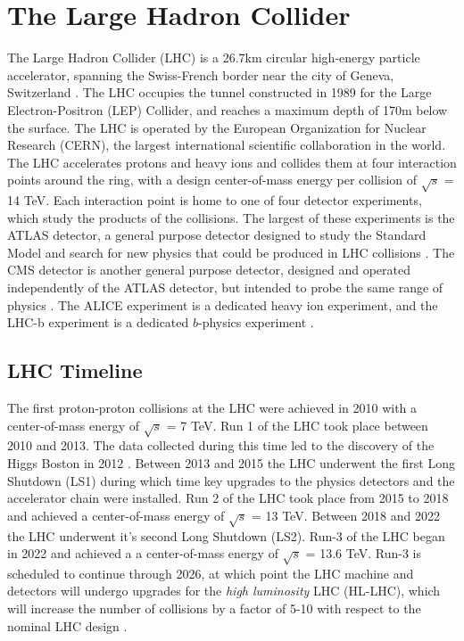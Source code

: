 \chapter{The Large Hadron Collider}
The Large Hadron Collider (LHC) is a 26.7km circular high-energy particle accelerator, spanning the Swiss-French border near the city of Geneva, Switzerland \cite{LHC_machine}. The LHC occupies the tunnel constructed in 1989 for the Large Electron-Positron (LEP) Collider, and reaches a maximum depth of 170m below the surface. The LHC is operated by the European Organization for Nuclear Research (CERN), the largest international scientific collaboration in the world.\\

The LHC accelerates protons and heavy ions and collides them at four interaction points around the ring, with a design center-of-mass energy per collision of $\sqrt{s}$ = 14 TeV. Each interaction point is home to one of four detector experiments, which study the products of the collisions. The largest of these experiments is the ATLAS detector, a general purpose detector designed to study the Standard Model and search for new physics that could be produced in LHC collisions \cite{ATLAS_at_LHC}. The CMS detector is another general purpose detector, designed and operated independently of the ATLAS detector, but intended to probe the same range of physics \cite{CMS_at_LHC}. The ALICE experiment is a dedicated heavy ion experiment, and the LHC-b experiment is a dedicated $b$-physics experiment  \cite{ALICE_at_LHC} \cite{LHCb_at_LHC}.\\

\section{LHC Timeline}
The first proton-proton collisions at the LHC were achieved in 2010 with a center-of-mass energy of $\sqrt{s}$ = 7 TeV. Run 1 of the LHC took place between 2010 and 2013. The data collected during this time led to the discovery of the Higgs Boston in 2012 \cite{higgs_paper}. Between 2013 and 2015 the LHC underwent the first Long Shutdown (LS1) during which time key upgrades to the physics detectors and the accelerator chain were installed. Run 2 of the LHC took place from 2015 to 2018 and achieved a center-of-mass energy of $\sqrt{s}$ = 13 TeV. Between 2018 and 2022 the LHC underwent it's second Long Shutdown (LS2). Run-3 of the LHC began in 2022 and achieved a a center-of-mass energy of $\sqrt{s}$ = 13.6 TeV. Run-3 is scheduled to continue through 2026, at which point the LHC machine and detectors will undergo upgrades for the \textit{high luminosity} LHC (HL-LHC), which will increase the number of collisions by a factor of 5-10 with respect to the nominal LHC design \cite{hl_lhc}. 

